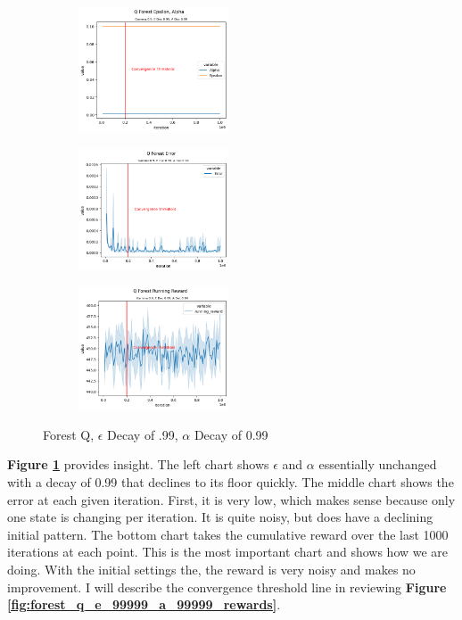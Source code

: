 \documentclass[letterpaper]{article} %
\begin{document}
\begin{figure}[!htb]

 	\begin{subfigure}[b]{0.275\textwidth}
		\centering
		\includegraphics[width=1.75in]{Figures/Q_Forest_Epsilon__Alpha_Gamma_0_9__E_Dec_0_99__A_Dec_0_99.png}
  	\end{subfigure}%
	 \begin{subfigure}[b]{0.275\textwidth}
	 	\centering
		\includegraphics[width=1.75in]{Figures/Q_Forest_Error_Gamma_0_9__E_Dec_0_99__A_Dec_0_99.png}
  	\end{subfigure}
	\begin{subfigure}[b]{0.5\textwidth}
		\centering
		\includegraphics[width=1.75in]{Figures/Q_Forest_Running_Reward_Gamma_0_9__E_Dec_0_99__A_Dec_0_99.png}
  	\end{subfigure}
\caption{Forest Q,  $\epsilon$ Decay of .99, $\alpha$ Decay of 0.99}
\label{fig:forest_q_e_99_a_99_rewards}
\end{figure}

\textbf{Figure \ref{fig:forest_q_e_99_a_99_rewards}} provides insight.  The left chart shows $\epsilon$ and $\alpha$ essentially unchanged with a decay of 0.99 that declines to its floor quickly.  The middle chart shows the error at each given iteration.  First, it is very low, which makes sense because only one state is changing per iteration.  It is quite noisy, but does have a declining initial pattern.  The bottom chart  takes the cumulative reward over the last 1000 iterations at each point.  This is the most important chart and shows how we are doing.  With the initial settings the, the reward is very noisy and makes no improvement.  I will describe the convergence threshold line in reviewing \textbf{Figure \ref{fig:forest_q_e_99999_a_99999_rewards}}.
\end{document}
